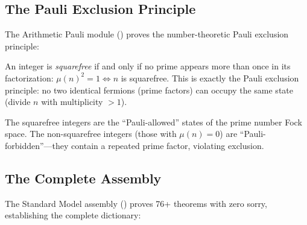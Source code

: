 \subsection{The Pauli Exclusion Principle}

The Arithmetic Pauli module () proves
the number-theoretic Pauli exclusion principle:

\begin{principle}[Pauli Exclusion $=$ Squarefree Condition]
An integer is \emph{squarefree} if and only if no prime
appears more than once in its factorization:
$\mu(n)^2 = 1 \iff n$ is squarefree. This is exactly the
Pauli exclusion principle: no two identical fermions (prime
factors) can occupy the same state (divide $n$ with multiplicity
$> 1$).

The squarefree integers are the ``Pauli-allowed'' states of the
prime number Fock space. The non-squarefree integers (those with
$\mu(n) = 0$) are ``Pauli-forbidden''---they contain a repeated
prime factor, violating exclusion.
\end{principle}

\subsection{The Complete Assembly}

The Standard Model assembly ()
proves 76+ theorems with zero sorry, establishing the complete
dictionary:

